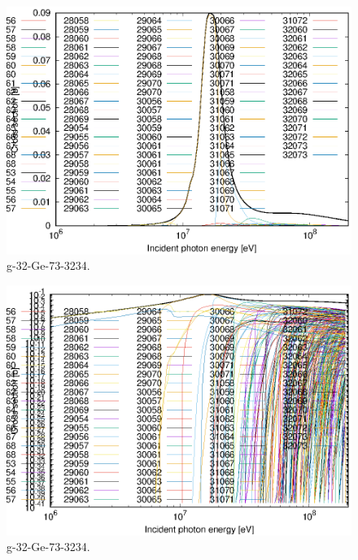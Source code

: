 \begin{figure}
 \includegraphics[width=\linewidth]{eps/g_32-Ge-73_3234.eps}
  \caption{g-32-Ge-73-3234.}
\end{figure}
\begin{figure}
 \includegraphics[width=\linewidth]{eps-log/g_32-Ge-73_3234.eps}
 \caption{g-32-Ge-73-3234.}
\end{figure}
\newpage \clearpage

